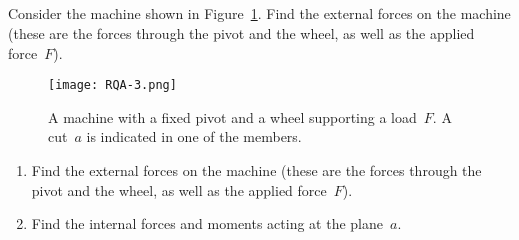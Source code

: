 \documentclass[a4paper,justified,oneside]{tufte-handout}
\numberwithin{equation}{subsection}
\begin{document}
\subsection{}
Consider the machine shown in Figure~\ref{A5:fig:Q3}. Find the external forces on the machine (these are the forces through the pivot and the wheel, as well as the applied force~$F$).
\begin{figure}
	\centering
	\texttt{[image: RQA-3.png]}
	\caption{A machine with a fixed pivot and a wheel supporting a load~$F$. A cut~$a$ is indicated in one of the members.}
	\label{A5:fig:Q3}
\end{figure}
\begin{enumerate}
	\item Find the external forces on the machine (these are the forces through the pivot and the wheel, as well as the applied force~$F$).
	\item Find the internal forces and moments acting at the plane~$a$.
\end{enumerate}
\end{document}
